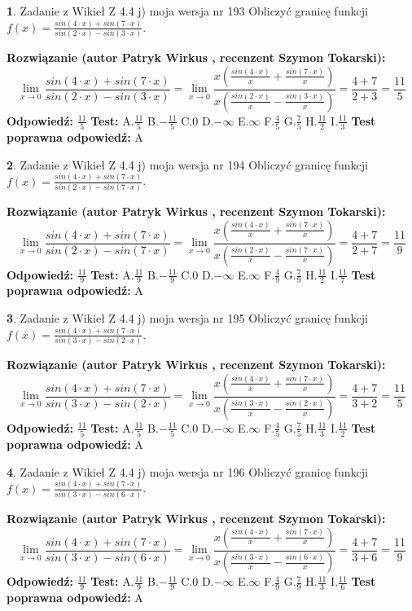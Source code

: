 \documentclass[12pt, a4paper]{article}
\theoremstyle{definition} %
\newtheorem{zad}{}
\newcommand{\zadStart}[1]{\begin{zad}#1\newline}
\newcommand{\zadStop}{\end{zad}}
\newcommand{\rozwStart}[2]{\noindent \textbf{Rozwiązanie (autor #1 , recenzent #2): }\newline}
\newcommand{\rozwStop}{\newline}
\newcommand{\odpStart}{\noindent \textbf{Odpowiedź:}\newline}
\newcommand{\odpStop}{\newline}
\newcommand{\testStart}{\noindent \textbf{Test:}\newline}
\newcommand{\testStop}{\newline}
\newcommand{\kluczStart}{\noindent \textbf{Test poprawna odpowiedź:}\newline}
\newcommand{\kluczStop}{\newline}
\begin{document}
\zadStart{Zadanie z Wikieł Z 4.4 j) moja wersja nr 193}
Obliczyć granicę funkcji $f(x)=\frac{sin(4\cdot x) +sin(7\cdot x)}{sin(2\cdot x) -sin(3\cdot x)}$.
\zadStop
\rozwStart{Patryk Wirkus}{Szymon Tokarski}
$$\lim\limits_{x\to 0}\frac{sin(4\cdot x) +sin(7\cdot x)}{sin(2\cdot x) -sin(3\cdot x)}=\lim\limits_{x\to 0}\frac{x(\frac{sin(4\cdot x)}{x}+\frac{sin(7\cdot x)}{x})}{x(\frac{sin(2\cdot x)}{x}-\frac{sin(3\cdot x)}{x})}=\frac{4+7}{2+3} = \frac{11}{5}$$
\rozwStop
\odpStart
$\frac{11}{5}$
\odpStop
\testStart
A.$\frac{11}{5}$
B.$-\frac{11}{5}$
C.$0$
D.$-\infty$
E.$\infty$
F.$\frac{4}{5}$
G.$\frac{7}{5}$
H.$\frac{11}{2}$
I.$\frac{11}{3}$
\testStop
\kluczStart
A
\kluczStop



\zadStart{Zadanie z Wikieł Z 4.4 j) moja wersja nr 194}
Obliczyć granicę funkcji $f(x)=\frac{sin(4\cdot x) +sin(7\cdot x)}{sin(2\cdot x) -sin(7\cdot x)}$.
\zadStop
\rozwStart{Patryk Wirkus}{Szymon Tokarski}
$$\lim\limits_{x\to 0}\frac{sin(4\cdot x) +sin(7\cdot x)}{sin(2\cdot x) -sin(7\cdot x)}=\lim\limits_{x\to 0}\frac{x(\frac{sin(4\cdot x)}{x}+\frac{sin(7\cdot x)}{x})}{x(\frac{sin(2\cdot x)}{x}-\frac{sin(7\cdot x)}{x})}=\frac{4+7}{2+7} = \frac{11}{9}$$
\rozwStop
\odpStart
$\frac{11}{9}$
\odpStop
\testStart
A.$\frac{11}{9}$
B.$-\frac{11}{9}$
C.$0$
D.$-\infty$
E.$\infty$
F.$\frac{4}{9}$
G.$\frac{7}{9}$
H.$\frac{11}{2}$
I.$\frac{11}{7}$
\testStop
\kluczStart
A
\kluczStop



\zadStart{Zadanie z Wikieł Z 4.4 j) moja wersja nr 195}
Obliczyć granicę funkcji $f(x)=\frac{sin(4\cdot x) +sin(7\cdot x)}{sin(3\cdot x) -sin(2\cdot x)}$.
\zadStop
\rozwStart{Patryk Wirkus}{Szymon Tokarski}
$$\lim\limits_{x\to 0}\frac{sin(4\cdot x) +sin(7\cdot x)}{sin(3\cdot x) -sin(2\cdot x)}=\lim\limits_{x\to 0}\frac{x(\frac{sin(4\cdot x)}{x}+\frac{sin(7\cdot x)}{x})}{x(\frac{sin(3\cdot x)}{x}-\frac{sin(2\cdot x)}{x})}=\frac{4+7}{3+2} = \frac{11}{5}$$
\rozwStop
\odpStart
$\frac{11}{5}$
\odpStop
\testStart
A.$\frac{11}{5}$
B.$-\frac{11}{5}$
C.$0$
D.$-\infty$
E.$\infty$
F.$\frac{4}{5}$
G.$\frac{7}{5}$
H.$\frac{11}{3}$
I.$\frac{11}{2}$
\testStop
\kluczStart
A
\kluczStop



\zadStart{Zadanie z Wikieł Z 4.4 j) moja wersja nr 196}
Obliczyć granicę funkcji $f(x)=\frac{sin(4\cdot x) +sin(7\cdot x)}{sin(3\cdot x) -sin(6\cdot x)}$.
\zadStop
\rozwStart{Patryk Wirkus}{Szymon Tokarski}
$$\lim\limits_{x\to 0}\frac{sin(4\cdot x) +sin(7\cdot x)}{sin(3\cdot x) -sin(6\cdot x)}=\lim\limits_{x\to 0}\frac{x(\frac{sin(4\cdot x)}{x}+\frac{sin(7\cdot x)}{x})}{x(\frac{sin(3\cdot x)}{x}-\frac{sin(6\cdot x)}{x})}=\frac{4+7}{3+6} = \frac{11}{9}$$
\rozwStop
\odpStart
$\frac{11}{9}$
\odpStop
\testStart
A.$\frac{11}{9}$
B.$-\frac{11}{9}$
C.$0$
D.$-\infty$
E.$\infty$
F.$\frac{4}{9}$
G.$\frac{7}{9}$
H.$\frac{11}{3}$
I.$\frac{11}{6}$
\testStop
\kluczStart
A
\kluczStop
\end{document}

